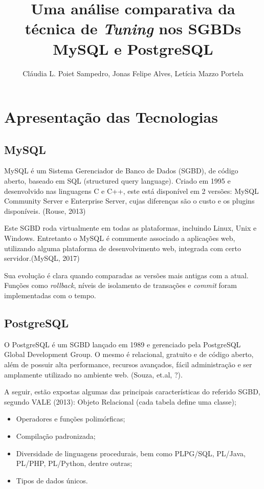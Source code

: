 \documentclass[12pt]{article}
\title{Uma análise comparativa da técnica de \textit{Tuning} nos SGBDs MySQL e PostgreSQL}
\author{Cláudia L. Poiet Sampedro\inst{1}, Jonas Felipe Alves\inst{2}, Letícia Mazzo Portela\inst{3}}
\begin{document}
 

\maketitle

  
     
  


\section{Apresentação das Tecnologias}
    \subsection{MySQL}
        MySQL é um Sistema Gerenciador de Banco de Dados (SGBD), de código aberto, baseado em SQL (structured query language). Criado em 1995 e desenvolvido nas linguagens C e C++, este está disponível em 2 versões: MySQL Community Server e Enterprise Server, cujas diferenças são o custo e os plugins disponíveis. (Rouse, 2013)
        
        Este SGBD roda virtualmente em todas as plataformas, incluindo Linux, Unix e Windows. Entretanto o MySQL é comumente associado a aplicações web, utilizando alguma plataforma de desenvolvimento web, integrada com certo servidor.(MySQL, 2017)
        
        Sua evolução é clara quando comparadas as versões mais antigas com a atual. Funções como \textit{rollback}, níveis de isolamento de transações e \textit{commit} foram implementadas com o tempo.
    \subsection{PostgreSQL}
        O PostgreSQL é um SGBD lançado em 1989 e gerenciado pela PostgreSQL Global Development Group. O mesmo é relacional, gratuito e de código aberto, além de possuir alta performance, recursos avançados, fácil administração e ser amplamente utilizado no ambiente web. (Souza, et.al, ?).
        
    	A seguir, estão expostas algumas das principais características do referido SGBD, segundo VALE (2013):
             Objeto Relacional (cada tabela define uma classe);
            \begin{itemize}
                \item Operadores e funções polimórficas;
                \item Compilação padronizada;
                \item Diversidade de linguagens procedurais, bem como PLPG/SQL, PL/Java, PL/PHP, PL/Python, dentre outras;
                \item Tipos de dados únicos.
            \end{itemize} 
\end{document}
